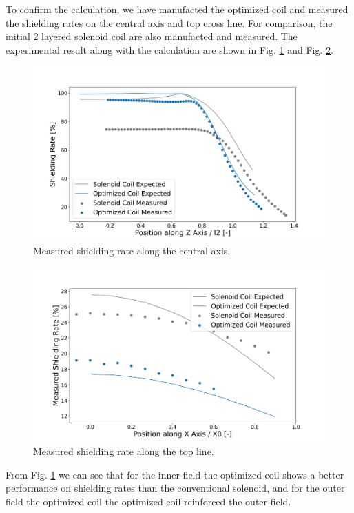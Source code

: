 To confirm the calculation, we have manufacted the optimized coil and measured the shielding rates on the central axis and top cross line.
For comparison, the initial 2 layered solenoid coil are also manufacted and measured.
The experimental result along with the calculation are shown in Fig. \ref{fig:optimizedCoilExperimentResultCentral} and Fig. \ref{fig:optimizedCoilExperimentResultTopLine}.
\begin{figure}[H]
  \includegraphics[width=18cm, bb=9 9 900 550]{./section4Optimal/combinedShieldingRates.png}
  \caption{Measured shielding rate along the central axis.}
  \label{fig:optimizedCoilExperimentResultCentral}
\end{figure}
\begin{figure}[H]
  \includegraphics[width=18cm, bb=9 9 900 550]{./section4Optimal/combinedShieldingRatesTopLine.png}
  \caption{Measured shielding rate along the top line.}
  \label{fig:optimizedCoilExperimentResultTopLine}
\end{figure}
From Fig. \ref{fig:optimizedCoilExperimentResultCentral} we can see that for the inner field the optimized coil shows a better performance on shielding rates than the conventional solenoid,
and for the outer field the optimized coil the optimized coil reinforced the outer field.


